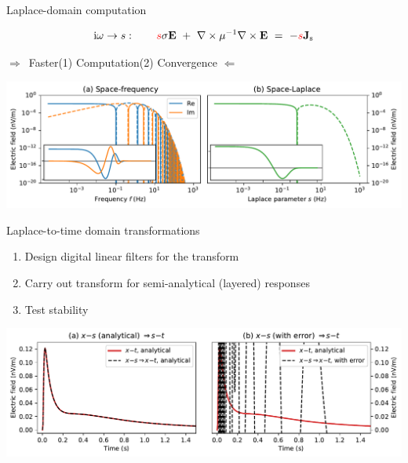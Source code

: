 \documentclass[xcolor=svgnames, usepdftitle=false, aspectratio=169]{beamer}
\newcommand{\bdra}{\ensuremath{\boldsymbol \Rightarrow }~}
\newcommand{\bdla}{\ensuremath{\boldsymbol \Leftarrow }~}
\newcommand{\mr}[1]{\mathrm{#1}}
\begin{document}
\begin{frame}
  {Laplace-domain computation}
  \centering
  \vspace{-.5cm}

  $$
    \mr{i}\omega \rightarrow s:
    \qquad
    \textcolor{red}{s} \sigma \mathbf{E} \ +\
    \nabla \times \mu^{-1} \nabla \times \mathbf{E}
    \ =\ -\textcolor{red}{s} \mathbf{J}_\mathrm{s}
  $$

  \bdra Faster\quad (1) Computation\quad (2) Convergence \quad \bdla\\
  \vspace{.5cm}

  \includegraphics[width=\textwidth]{motivationcomparison}

\end{frame}

\begin{frame}
  {Laplace-to-time domain transformations}

  \begin{enumerate}
    \item Design digital linear filters for the transform
    \item Carry out transform for semi-analytical (layered) responses
    \item Test stability
  \end{enumerate}


  \includegraphics[width=\linewidth]{s-t_time}%

\end{frame}
\end{document}
